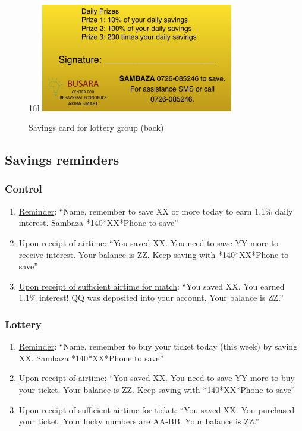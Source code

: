 \documentclass[11pt]{article}
\makeatletter
\newcommand*{\centerfloat}{%
  \parindent \z@
  \leftskip \z@ \@plus 1fil \@minus \textwidth
  \rightskip\leftskip
  \parfillskip \z@skip}
\makeatother
\begin{document}
        \begin{figure}[h]
        \centering
        \caption{Savings card for lottery group (back)}
        \centerfloat
        \includegraphics[width=0.75\textwidth]{../../figures/id_back.pdf}
        \end{figure}

    \clearpage

    \subsection{Savings reminders}

        \subsubsection{Control}

            \begin{enumerate}
                \item \underline{Reminder}: ``{Name}, remember to save XX or more today to earn 1.1\% daily interest. Sambaza *140*XX*Phone to save''
                \item \underline{Upon receipt of airtime}: ``You saved XX.  You need to save YY more to receive interest. Your balance is ZZ. Keep saving with *140*XX*Phone to save''
                \item \underline{Upon receipt of sufficient airtime for match}: ``You saved XX.  You earned 1.1\% interest!  QQ was deposited into your account.  Your balance is ZZ.''
            \end{enumerate}

        \subsubsection{Lottery}

            \begin{enumerate}
                \item \underline{Reminder}: ``{Name}, remember to buy your ticket today (this week) by saving XX. Sambaza *140*XX*Phone to save''
                \item \underline{Upon receipt of airtime}: ``You saved XX.  You need to save YY more to buy your ticket. Your balance is ZZ. Keep saving with *140*XX*Phone to save''
                \item \underline{Upon receipt of sufficient airtime for ticket}: ``You saved XX. You purchased your ticket. Your lucky numbers are AA-BB. Your balance is ZZ.''
            \end{enumerate}
\end{document}
